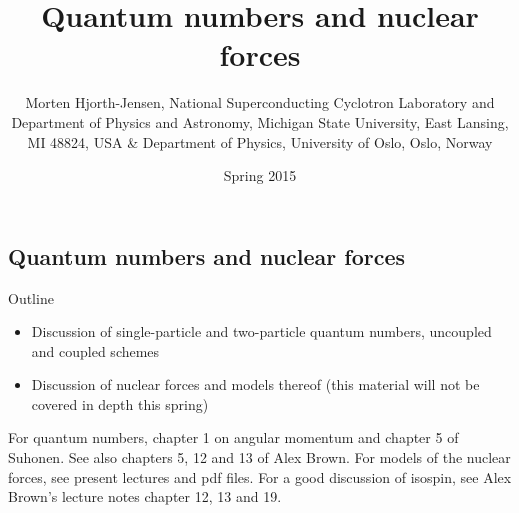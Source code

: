 \documentclass[%
twoside,                 %
final,                   %
10pt]{article}
\begin{document}






\title{Quantum numbers and nuclear forces}


\author{Morten Hjorth-Jensen, National Superconducting Cyclotron Laboratory and Department of Physics and Astronomy, Michigan State University, East Lansing, MI 48824, USA {\&} Department of Physics, University of Oslo, Oslo, Norway\inst{}}
\institute{}

\date{Spring 2015
}

\subsection{Quantum numbers and nuclear forces}
\begin{block}{Outline }
\begin{itemize}
\item Discussion of single-particle and two-particle quantum numbers, uncoupled and coupled schemes

\item Discussion of nuclear forces and models thereof (this material will not be covered in depth this spring)
\end{itemize}

\noindent
For quantum numbers, chapter 1 on angular momentum and chapter 5 of Suhonen.
See also chapters 5, 12 and 13 of Alex Brown. For models of the nuclear forces, see present lectures and pdf files.
For a good discussion of isospin, see Alex Brown's lecture notes chapter 12, 13 and 19.
\end{block}



\end{document}
